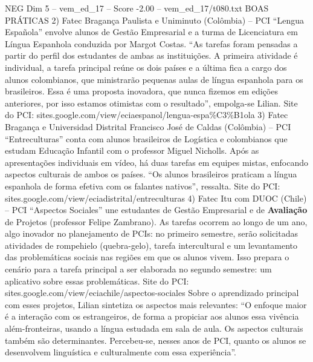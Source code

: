 \begin{textsample}{NEG Dim 5 – vem\_ed\_17 – Score -2.00 – vem\_ed\_17/t080.txt}  \label{ex:f5_neg_031}
BOAS PRÁTICAS 2) Fatec Bragança Paulista e Uniminuto (Colômbia) – PCI “Lengua Española” envolve alunos de Gestão Empresarial e a turma de Licenciatura em Língua Espanhola conduzida por Margot Costas. “As tarefas foram pensadas a partir do perfil dos estudantes de ambas as instituições.
A primeira atividade é individual, a tarefa principal reúne os dois países e a última fica a cargo dos alunos colombianos, que ministrarão pequenas aulas de língua espanhola para os brasileiros.
Essa é uma proposta inovadora, que nunca fizemos em edições anteriores, por isso estamos otimistas com o resultado”, empolga-se Lilian.
Site do PCI: sites.google.com/view/eciaespanol/lengua-espa\%C3\%B1ola 3) Fatec Bragança e Universidad Distrital Francisco José de Caldas (Colômbia) – PCI “Entreculturas” conta com alunos brasileiros de Logística e colombianos que estudam Educação Infantil com o professor Miguel Nicholls.
Após as apresentações individuais em vídeo, há duas tarefas em equipes mistas, enfocando aspectos culturais de ambos os países. “Os alunos brasileiros praticam a língua espanhola de forma efetiva com os falantes nativos”, ressalta.
Site do PCI: sites.google.com/view/eciadistrital/entreculturas 4) Fatec Itu com DUOC (Chile) – PCI “Aspectos Sociales” une estudantes de Gestão Empresarial e de \textbf{Avaliação} de Projetos (professor Felipe Zambrano).
As tarefas ocorrem ao longo de um ano, algo inovador no planejamento de PCIs: no primeiro semestre, serão solicitadas atividades de rompehielo (quebra-gelo), tarefa intercultural e um levantamento das problemáticas sociais nas regiões em que os alunos vivem.
Isso prepara o cenário para a tarefa principal a ser elaborada no segundo semestre: um aplicativo sobre essas problemáticas.
Site do PCI: sites.google.com/view/eciachile/aspectos-sociales Sobre o aprendizado principal com esses projetos, Lilian sintetiza os aspectos mais relevantes: “O enfoque maior é a interação com os estrangeiros, de forma a propiciar aos alunos essa vivência além-fronteiras, usando a língua estudada em sala de aula.
Os aspectos culturais também são determinantes.
Percebeu-se, nesses anos de PCI, quanto os alunos se desenvolvem linguística e culturalmente com essa experiência”.

\end{textsample}
